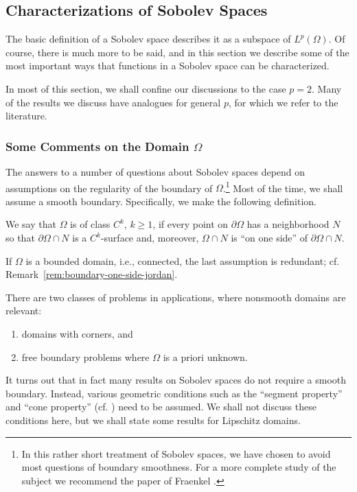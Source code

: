 \subsection{Characterizations of Sobolev Spaces}\label{sec:sobolev-characterizations}

The basic definition of a Sobolev space describes it as a subspace of $L^p(\Omega)$. Of course, there is much more to be said, and in this section we describe some of the most important ways that functions in a Sobolev space can be characterized.

In most of this section, we shall confine our discussions to the case $p=2$. Many of the results we discuss have analogues for general $p$, for which we refer to the literature.

\subsubsection{Some Comments on the Domain $\Omega$}\label{subsec:sobolev-domain-boundary-hypotheses}

The answers to a number of questions about Sobolev spaces depend on assumptions on the regularity of the boundary of $\Omega$.\footnote{In this rather short treatment of Sobolev spaces, we have chosen to avoid most questions of boundary smoothness. For a more complete study of the subject we recommend the paper of Fraenkel \cite{Fr}.} Most of the time, we shall assume a smooth boundary. Specifically, we make the following definition.

\begin{Definition}
\label{def:c-k-domain-boundary}
We say that $\Omega$ is of class $C^k$, $k\geq1$, if every point on $\partial\Omega$ has a neighborhood $N$ so that $\partial\Omega\cap N$ is a $C^k$-surface and, moreover, $\Omega\cap N$ is ``on one side'' of $\partial\Omega\cap N$.
\end{Definition}

If $\Omega$ is a bounded domain, i.e., connected, the last assumption is redundant; cf. Remark~\ref{rem:boundary-one-side-jordan}.

There are two classes of problems in applications, where nonsmooth domains are relevant:\begin{enumerate}
\item domains with corners, and
\item free boundary problems where $\Omega$ is a priori unknown.
\end{enumerate}It turns out that in fact many results on Sobolev spaces do not require a smooth boundary. Instead, various geometric conditions such as the ``segment property'' and ``cone property'' (cf. \cite{Fr}) need to be assumed. We shall not discuss these conditions here, but we shall state some results for Lipschitz domains.

